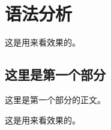 \chapter{语法分析}

\begin{center}
这是用来看效果的。
\end{center}

\section{这里是第一个部分}

这里是第一个部分的正文。

\newpage

\begin{center}
这是用来看效果的。
\end{center}


